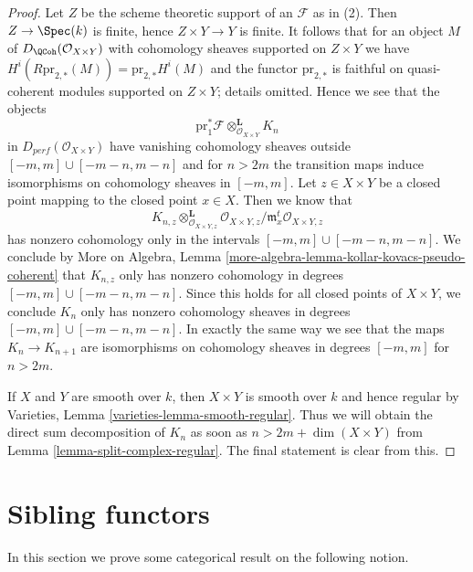 \begin{proof}
Let $Z$ be the scheme theoretic support of an $\mathcal{F}$ as in (2).
Then $Z \to \Spec(k)$ is finite, hence $Z \times Y \to Y$ is finite.
It follows that for an object $M$ of $D_\QCoh(\mathcal{O}_{X \times Y})$
with cohomology sheaves supported on $Z \times Y$ we have
$H^i(R\text{pr}_{2, *}(M)) = \text{pr}_{2, *}H^i(M)$ and the functor
$\text{pr}_{2, *}$ is faithful on quasi-coherent modules supported
on $Z \times Y$; details omitted. Hence we see that the objects
$$
\text{pr}_1^*\mathcal{F} \otimes_{\mathcal{O}_{X \times Y}}^\mathbf{L} K_n
$$
in $D_{perf}(\mathcal{O}_{X \times Y})$ have vanishing cohomology sheaves
outside $[-m, m] \cup [-m - n, m - n]$ and for $n > 2m$ the transition maps
induce isomorphisms on cohomology sheaves in $[-m, m]$.
Let $z \in X \times Y$ be a closed point mapping to the closed point
$x \in X$. Then we know that
$$
K_{n, z} \otimes_{\mathcal{O}_{X \times Y, z}}^\mathbf{L}
\mathcal{O}_{X \times Y, z}/\mathfrak m_x^t\mathcal{O}_{X \times Y, z}
$$
has nonzero cohomology only in the intervals
$[-m, m] \cup [-m - n, m - n]$.
We conclude by More on Algebra, Lemma
\ref{more-algebra-lemma-kollar-kovacs-pseudo-coherent}
that $K_{n, z}$ only has nonzero cohomology
in degrees $[-m, m] \cup [-m - n, m - n]$. Since this holds for all
closed points of $X \times Y$, we conclude $K_n$ only has nonzero
cohomology sheaves in degrees $[-m, m] \cup [-m - n, m - n]$.
In exactly the same way we see that the maps $K_n \to K_{n + 1}$
are isomorphisms on cohomology sheaves in degrees $[-m, m]$
for $n > 2m$.

\medskip\noindent
If $X$ and $Y$ are smooth over $k$, then $X \times Y$ is smooth
over $k$ and hence regular by
Varieties, Lemma \ref{varieties-lemma-smooth-regular}.
Thus we will obtain the direct sum decomposition of $K_n$
as soon as $n > 2m + \dim(X \times Y)$ from
Lemma \ref{lemma-split-complex-regular}. The final statement
is clear from this.
\end{proof}





\section{Sibling functors}
\label{section-sibling}

\noindent
In this section we prove some categorical result on the following notion.

